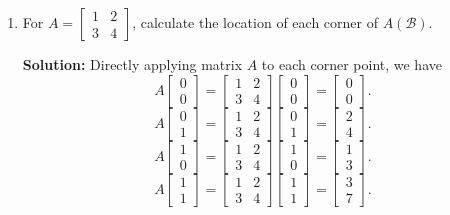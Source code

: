 \documentclass[10pt]{article}
\theoremstyle{definition}
\theoremstyle{plain}
\begin{document}
\begin{enumerate}[label=(\alph*)]
\item For $A = \begin{bmatrix} 1 & 2 \\ 3 & 4 \end{bmatrix}$, calculate the location of each corner of $A(\mathcal{B})$.

\textbf{Solution:} Directly applying matrix $A$ to each corner point, we have
\[
A \begin{bmatrix} 0 \\ 0 \end{bmatrix} = \begin{bmatrix} 1 & 2 \\ 3 & 4 \end{bmatrix} \begin{bmatrix} 0 \\ 0 \end{bmatrix} = \begin{bmatrix} 0 \\ 0 \end{bmatrix}.
\]
\[
A \begin{bmatrix} 0 \\ 1 \end{bmatrix} = \begin{bmatrix} 1 & 2 \\ 3 & 4 \end{bmatrix} \begin{bmatrix} 0 \\ 1 \end{bmatrix} = \begin{bmatrix} 2 \\ 4 \end{bmatrix}.
\]
\[
A \begin{bmatrix} 1 \\ 0 \end{bmatrix} = \begin{bmatrix} 1 & 2 \\ 3 & 4 \end{bmatrix} \begin{bmatrix} 1 \\ 0 \end{bmatrix} = \begin{bmatrix} 1 \\ 3 \end{bmatrix}.
\]
\[
A \begin{bmatrix} 1 \\ 1 \end{bmatrix} = \begin{bmatrix} 1 & 2 \\ 3 & 4 \end{bmatrix} \begin{bmatrix} 1 \\ 1 \end{bmatrix} = \begin{bmatrix} 3 \\ 7 \end{bmatrix}.
\]


\end{enumerate}
\end{document}
